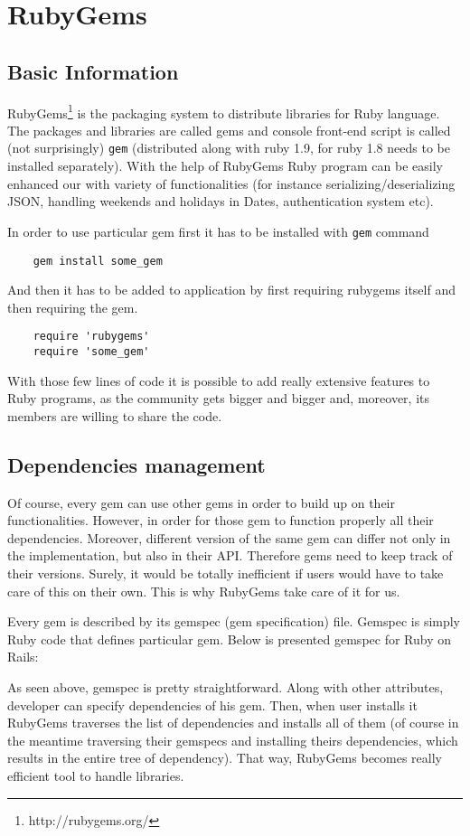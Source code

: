   \section{RubyGems}
    \subsection{Basic Information}
  RubyGems\footnote{http://rubygems.org/} is the packaging system to distribute libraries for Ruby language. The packages and libraries are called gems and console front-end script is called (not surprisingly) \texttt{gem} (distributed along with ruby 1.9, for ruby 1.8 needs to be installed separately). With the help of RubyGems Ruby program can be easily enhanced our with variety of functionalities (for instance serializing/deserializing JSON, handling weekends and holidays in Dates, authentication system etc). 
  
  In order to use particular gem first it has to be installed with \texttt{gem} command 
  \begin{lstlisting}
    gem install some_gem
  \end{lstlisting}
  
  And then it has to be added to application by first requiring rubygems itself and then requiring the gem.
  
  \begin{lstlisting}
    require 'rubygems'
    require 'some_gem'
  \end{lstlisting}
  
  With those few lines of code it is possible to add really extensive features to Ruby programs, as the community gets bigger and bigger and, moreover, its members are willing to share the code.
  
    \subsection{Dependencies management}
  Of course, every gem can use other gems in order to build up on their functionalities. However, in order for those gem to function properly all their dependencies. Moreover, different version of the same gem can differ not only in the implementation, but also in their API. Therefore gems need to keep track of their versions. Surely, it would be totally inefficient if users would have to take care of this on their own. This is why RubyGems take care of it for us.
  
  Every gem is described by its gemspec (gem specification) file. Gemspec is simply Ruby code that defines particular gem. Below is presented gemspec for Ruby on Rails:
  
  
  
  As seen above, gemspec is pretty straightforward. Along with other attributes, developer can specify dependencies of his gem. Then, when user installs it RubyGems traverses the list of dependencies and installs all of them (of course in the meantime traversing their gemspecs and installing theirs dependencies, which results in the entire tree of dependency). That way, RubyGems becomes really efficient tool to handle libraries. 
  
